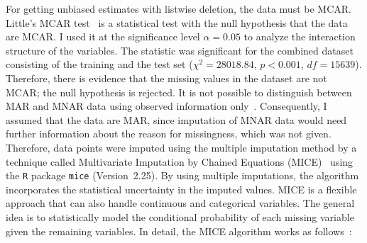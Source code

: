 \documentclass[a4paper]{article}
\begin{document}
For getting unbiased estimates with listwise deletion, the data must
be MCAR. Little's MCAR test~\cite{little1988test} is a statistical
test with the null hypothesis that the data are MCAR. I used it at the
significance level $\alpha=0.05$ to analyze the interaction structure
of the variables. The statistic was significant for the combined
dataset consisting of the training and the test set
($\chi^2 = 28018.84$, $p < 0.001$, $df=15639$). Therefore, there is
evidence that the missing values in the dataset are not MCAR; the null
hypothesis is rejected. It is not possible to distinguish between MAR
and MNAR data using observed information
only~\cite{sterne2009multiple}. Consequently, I assumed that the data
are MAR, since imputation of MNAR data would need further information
about the reason for missingness, which was not given.  Therefore,
data points were imputed using the multiple imputation method by a
technique called Multivariate Imputation by Chained Equations
(MICE)~\cite{buuren2011mice} using the \texttt{R} package
\texttt{mice} (Version~2.25). By using multiple imputations, the
algorithm incorporates the statistical uncertainty in the imputed
values. MICE is a flexible approach that can also handle continuous
and categorical variables. The general idea is to statistically model
the conditional probability of each missing variable given the
remaining variables. In detail, the MICE algorithm works as
follows~\cite{buuren2011mice,azur2011multiple}:
\end{document}
